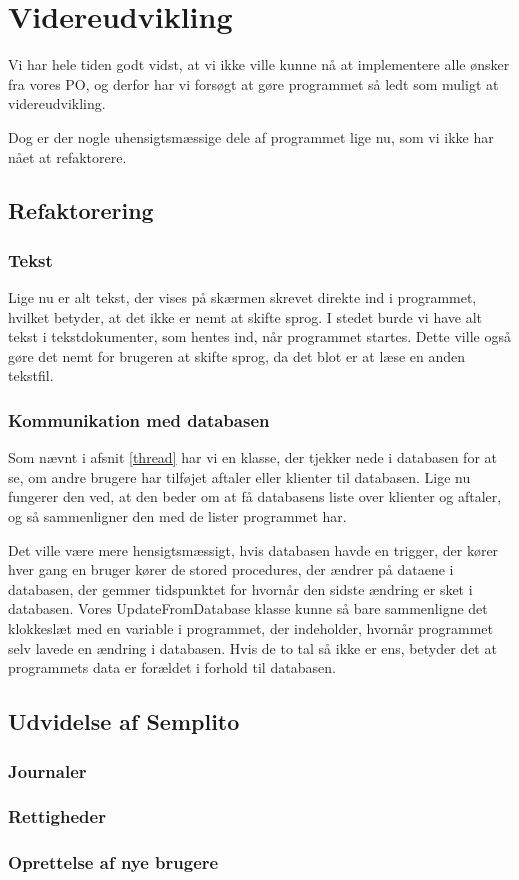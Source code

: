 \section{Videreudvikling}

Vi har hele tiden godt vidst, at vi ikke ville kunne nå at implementere alle ønsker fra vores PO, og derfor har vi forsøgt at gøre programmet så ledt som muligt at videreudvikling.

Dog er der nogle uhensigtsmæssige dele af programmet lige nu, som vi ikke har nået at refaktorere.

\subsection{Refaktorering}
\subsubsection{Tekst}
Lige nu er alt tekst, der vises på skærmen skrevet direkte ind i programmet, hvilket betyder, at det ikke er nemt at skifte sprog.
I stedet burde vi have alt tekst i tekstdokumenter, som hentes ind, når programmet startes.
Dette ville også gøre det nemt for brugeren at skifte sprog, da det blot er at læse en anden tekstfil.

\subsubsection{Kommunikation med databasen}
Som nævnt i afsnit \ref{thread} har vi en klasse, der tjekker nede i databasen for at se, om andre brugere har tilføjet aftaler eller klienter til databasen.
Lige nu fungerer den ved, at den beder om at få databasens liste over klienter og aftaler, og så sammenligner den med de lister programmet har.

Det ville være mere hensigtsmæssigt, hvis databasen havde en trigger, der kører hver gang en bruger kører de stored procedures, der ændrer på dataene i databasen, der gemmer tidspunktet for hvornår den sidste ændring er sket i databasen.
Vores UpdateFromDatabase klasse kunne så bare sammenligne det klokkeslæt med en variable i programmet, der indeholder, hvornår programmet selv lavede en ændring i databasen.
Hvis de to tal så ikke er ens, betyder det at programmets data er forældet i forhold til databasen.

\subsection{Udvidelse af Semplito}

\subsubsection{Journaler}

\subsubsection{Rettigheder}

\subsubsection{Oprettelse af nye brugere}
